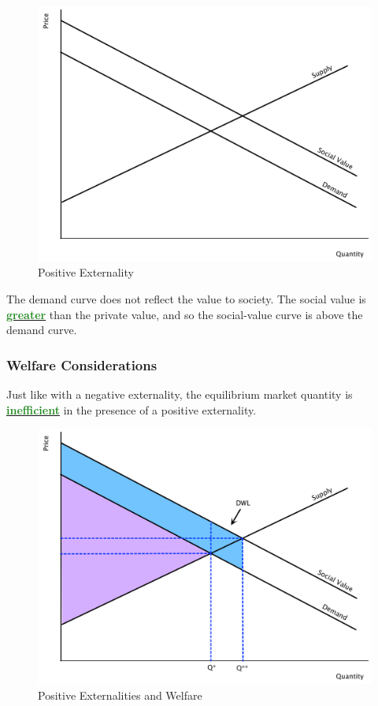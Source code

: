 \documentclass[11pt]{article}\usepackage[]{graphicx}\usepackage[]{color}
\theoremstyle{definition}
\newcommand{\dd}[1]{{\underline{\textbf{\textcolor{ForestGreen}{#1}}}}}
\begin{document}
	\begin{figure}[H]
			\centering
			\includegraphics[scale=.35]{plot52.pdf}
			\caption{Positive Externality}
	\end{figure}
	
	The demand curve does not reflect the value to society. The social value is \dd{greater} than the private value, and so the social-value curve is above the demand curve.
	
	\subsubsection*{Welfare Considerations}
	
	
	Just like with a negative externality, the equilibrium market quantity is \dd{inefficient} in the presence of a positive externality.
	\\
	
		\begin{figure}[H]
			\centering
			\includegraphics[scale=.35]{plot53.pdf}
			\caption{Positive Externalities and Welfare}
		\end{figure}
	
\end{document}
